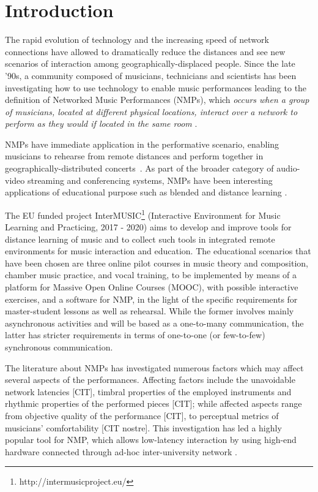 
\section{Introduction}\label{sec:introduction}

The rapid evolution of technology and the increasing speed of network connections have allowed to dramatically reduce the distances and see new scenarios of interaction among geogra\-phically-displaced people. Since the late '90s, a community composed of musicians, technicians and  scientists has been investigating how to use technology to enable music performances leading to the definition of Networked Music Performances (NMPs), which \textit{occurs when a group of musicians, located at different physical locations, interact over a network to perform as they would if located in the same room} \cite{Lazzaro2001}.

NMPs have immediate application in the performative scenario, enabling musicians to rehearse from remote distances and perform together in geographically-distributed concerts~\cite{barbosa2003displaced}. As part of the broader category of audio-video streaming and conferencing systems, NMPs have been interesting applications of educational purpose such as blended and distance learning \cite{IorwerthNMP2015}.    


The EU funded project InterMUSIC\footnote{http://intermusicproject.eu/} (Interactive Environment for Music Learning and Practicing, 2017 - 2020) aims to develop and improve tools for distance learning of music and to collect such tools in integrated remote environments for music interaction and education. The educational scenarios that have been chosen are three online pilot courses in music theory and composition, chamber music practice, and vocal training, to be implemented by means of a platform for Massive Open Online Courses (MOOC), with possible interactive exercises, and a software for NMP, in the light of the specific requirements for master-student lessons as well as rehearsal. While the former involves mainly asynchronous activities and will be based as a one-to-many communication, the latter has stricter requirements in terms of one-to-one (or few-to-few) synchronous communication. 

The literature about NMPs has investigated numerous factors which may affect several aspects of the performances. Affecting factors include the unavoidable network latencies [CIT], timbral properties of the employed instruments and rhythmic properties of the performed pieces [CIT]; while affected aspects range from objective quality of the performance [CIT], to perceptual metrics of musicians' comfortability [CIT nostre]. This investigation has led a highly popular tool for NMP, which allows low-latency interaction by using high-end hardware connected through ad-hoc inter-university network \cite{drioli2013networked}. 


